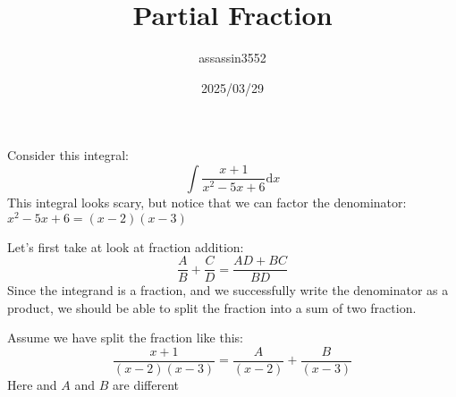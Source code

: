 \documentclass{article}
\title{Partial Fraction}
\author{assassin3552}
\date{2025/03/29}
\numberwithin{equation}{section}
\begin{document}
\maketitle

Consider this integral:
\[
\int \frac{x + 1}{x^2 -5x + 6} \mathrm{d}x
\]
This integral looks scary, but notice that we can factor the denominator:
$x^2 - 5x + 6 = (x-2)(x-3)$

Let's first take at look at fraction addition:
\[
\frac{A}{B} + \frac{C}{D} = \frac{AD + BC}{BD}
\]
Since the integrand is a fraction, and we successfully write the denominator as a product,
we should be able to split the fraction into a sum of two fraction.

Assume we have split the fraction like this:
\[
\frac{x + 1}{(x - 2)(x - 3)} = \frac{A}{(x - 2)} + \frac{B}{(x - 3)}
\]
Here and $A$ and $B$ are different  
\end{document}
